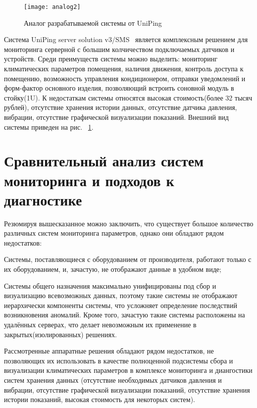 \begin{figure}[!h]
	\centering
	\texttt{[image: analog2]}
	\caption{Аналог разрабатываемой системы от  UniPing}
	\label{fig:analog2}
\end{figure}

Система UniPing server solution v3/SMS~\cite{analog2} является комплексным решением для мониторинга серверной с большим колчичеством подключаемых датчиков и устройств. Среди преимуществ системы можно выделить: мониторинг климатических параметров помещения, наличия движения, контроль доступа к помещению, возможность управления кондиционером, отправки уведомлений и форм-фактор основного изделия, позволяющий встроить  соновной модуль в стойку(1U). К недостаткам системы относятся высокая стоимость(более 32 тысяч рублей), отсутствие хранения истории данных, отсутствие датчика давления, вибрации, отсутствие графической визуализации показаний. Внешний вид системы приведен на рис. ~\ref{fig:analog2}.  

\section{Сравнительный анализ систем мониторинга и подходов к диагностике}

Резюмируя вышесказанное можно заключить, что существует большое количество различных систем мониторинга параметров, однако они обладают рядом недостатков:
\begin{itemize*}
	\item{Системы, поставляющиеся с оборудованием от производителя, работают только с их оборудованием, и, зачастую, не отображают данные в удобном виде;}
	\item{Системы общего назначения максимально унифицированы под сбор и визуализацию всевозможных данных, поэтому такие системы не отображают иерархически компоненты системы, что усложняет определение последствий возникновения аномалий.  Кроме того, зачастую такие системы расположены на удалённых серверах, что делает невозможным их применение в закрытых(изолированных) решениях.}
\end{itemize*}

Рассмотренные аппаратные решения обладают рядом недостатков, не позволяющих их использовать в качестве полноценной подсистемы сбора и визуализации климатических параметров в комплексе мониторинга и диангостики систем хранения данных (отсутствие необходимых датчиков давления и вибрации, отсутствие графической визуализации показаний, отсутствие хранения истории показаний, высокая стоимость для некоторых систем).

